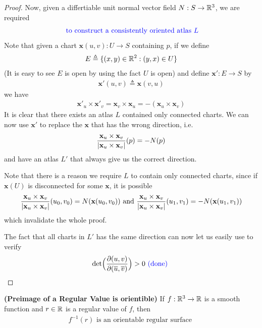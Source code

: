 \documentclass{report}
\begin{document}
\begin{proof}
Now, given a differtiable unit normal vector field $N:S\rightarrow \mathbb{R}^3$, we are required 
\begin{align*}
\textcolor{blue}{\text{ to construct a consistently oriented atlas }L}
\end{align*}
Note that given a chart $\textbf{x}(u,v):U\rightarrow S$ containing $p$, if we define 
\begin{align*}
E\triangleq \{ (x,y)\in\mathbb{R}^2: (y,x)\in U \}
\end{align*}
(It is easy to see $E$ is open by using the fact $U$ is open) and define $\textbf{x}':E\rightarrow S$ by 
\begin{align*}
\textbf{x}'(u,v)\triangleq \textbf{x}(v,u)
\end{align*}
we have 
\begin{align*}
\textbf{x}'_u\times \textbf{x}'_v= \textbf{x}_v\times \textbf{x}_u = -(\textbf{x}_u \times \textbf{x}_v)
\end{align*}
It is clear that there exists an atlas $L$ contained only connected charts. We can now use  $\textbf{x}'$ to replace the $\textbf{x}$ that has the wrong direction, i.e. 
\begin{align*}
\frac{\textbf{x}_u\times \textbf{x}_v}{\left|\textbf{x}_u \times \textbf{x}_v\right|}(p)=-N(p)
\end{align*}
and have an atlas $L'$ that always give us the correct direction.
\begin{mdframed}
Note that there is a reason we require $L$ to contain only connected charts, since if $\textbf{x}(U)$ is disconnected for some $\textbf{x}$, it is possible  
\begin{align*}
\frac{\textbf{x}_u \times \textbf{x}_v}{\left|\textbf{x}_u \times \textbf{x}_v\right|}(u_0,v_0)=N(\textbf{x}(u_0,v_0))\text{ and }\frac{\textbf{x}_u \times \textbf{x}_v}{\left|\textbf{x}_u \times \textbf{x}_v\right|}(u_1,v_1)=-N(\textbf{x}(u_1,v_1))
\end{align*}
which invalidate the whole proof.
\end{mdframed}
The fact that all charts in $L'$ has the same direction can now let us easily use  to verify 
 \begin{align*}
\text{det}\Big(\frac{\partial  (u,v)}{\partial (\overline{u},\overline{v})} \Big) >0 \textcolor{blue}{\text{ (done) }}
\end{align*}
\end{proof}
\begin{theorem}
\label{PoaR}
\textbf{(Preimage of a Regular Value is orientible)} If $f:\mathbb{R}^3\rightarrow \mathbb{R}$ is a smooth function and $r\in\mathbb{R}$ is a regular value of $f$, then 
 \begin{align*}
f^{-1}(r)\text{ is an orientable regular surface }
\end{align*}
\end{theorem}
\end{document}
